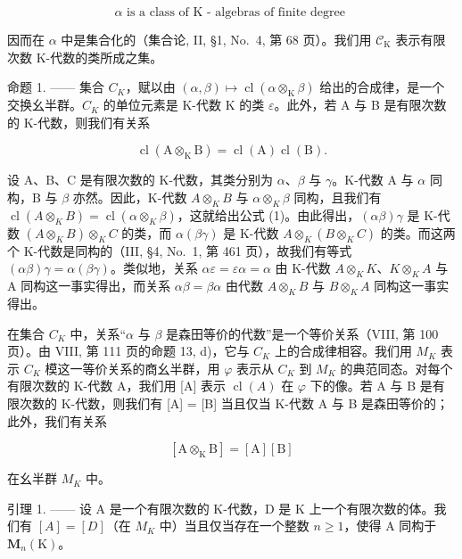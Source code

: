 \[
\alpha \text {   is   a   class   of   K - algebras   of   finite   degree }
\]

因而在 \(\alpha\) 中是集合化的（集合论, II, §1, No.~4, 第 68 页）。我们用 \(\mathcal{C}_{\mathrm{K}}\) 表示有限次数 K-代数的类所成之集。

命题 1. —— 集合 \(C_{K}\)，赋以由 \((\alpha, \beta) \mapsto \operatorname{cl}(\alpha \otimes_{\mathrm{K}} \beta)\) 给出的合成律，是一个交换幺半群。\(C_{K}\) 的单位元素是 K-代数 K 的类 \(\varepsilon\)。此外，若 A 与 B 是有限次数的 K-代数，则我们有关系

\[
\operatorname{cl} (\mathrm{A} \otimes_ {\mathrm{K}} \mathrm{B}) = \operatorname{cl} (\mathrm{A}) \operatorname{cl} (\mathrm{B}).\tag{1}
\]

设 A、B、C 是有限次数的 K-代数，其类分别为 \(\alpha\)、\(\beta\) 与 \(\gamma\)。K-代数 A 与 \(\alpha\) 同构，B 与 \(\beta\) 亦然。因此，K-代数 \(A \otimes_{K} B\) 与 \(\alpha \otimes_{K} \beta\) 同构，且我们有 \(\operatorname{cl}(A \otimes_{K} B) = \operatorname{cl}(\alpha \otimes_{K} \beta)\)，这就给出公式 (1)。由此得出，\((\alpha\beta)\gamma\) 是 K-代数 \((A \otimes_{K} B) \otimes_{K} C\) 的类，而 \(\alpha(\beta\gamma)\) 是 K-代数 \(A \otimes_{K} (B \otimes_{K} C)\) 的类。而这两个 K-代数是同构的（III, §4, No.~1, 第 461 页），故我们有等式 \((\alpha\beta)\gamma = \alpha(\beta\gamma)\)。类似地，关系 \(\alpha\varepsilon = \varepsilon\alpha = \alpha\) 由 K-代数 \(A \otimes_{K} K\)、\(K \otimes_{K} A\) 与 A 同构这一事实得出，而关系 \(\alpha\beta = \beta\alpha\) 由代数 \(A \otimes_{K} B\) 与 \(B \otimes_{K} A\) 同构这一事实得出。

在集合 \(C_{K}\) 中，关系“\(\alpha\) 与 \(\beta\) 是森田等价的代数”是一个等价关系（VIII, 第 100 页）。由 VIII, 第 111 页的命题 13, d)，它与 \(C_{K}\) 上的合成律相容。我们用 \(M_{K}\) 表示 \(C_{K}\) 模这一等价关系的商幺半群，用 \(\varphi\) 表示从 \(C_{K}\) 到 \(M_{K}\) 的典范同态。对每个有限次数的 K-代数 A，我们用 {[}A{]} 表示 \(\operatorname{cl}(A)\) 在 \(\varphi\) 下的像。若 A 与 B 是有限次数的 K-代数，则我们有 {[}A{]} = {[}B{]} 当且仅当 K-代数 A 与 B 是森田等价的；此外，我们有关系

\[
[ \mathrm{A} \otimes_ {\mathrm{K}} \mathrm{B} ] = [ \mathrm{A} ] [ \mathrm{B} ]\tag{2}
\]

在幺半群 \(M_{K}\) 中。

引理 1. —— 设 A 是一个有限次数的 K-代数，D 是 K 上一个有限次数的体。我们有 \([A]=[D]\)（在 \(M_{K}\) 中）当且仅当存在一个整数 \(n\geqslant1\)，使得 A 同构于 \(\mathbf{M}_{n}(\mathrm{K})\)。

